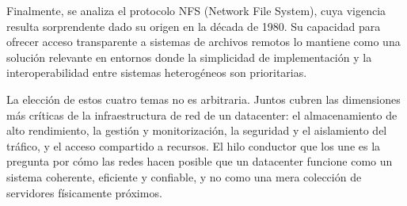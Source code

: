 	Finalmente, se analiza el protocolo NFS (Network File System), cuya vigencia resulta sorprendente dado su origen en la década de 1980. Su capacidad para ofrecer acceso transparente a sistemas de archivos remotos lo mantiene como una solución relevante en entornos donde la simplicidad de implementación y la interoperabilidad entre sistemas heterogéneos son prioritarias.
	
	La elección de estos cuatro temas no es arbitraria. Juntos cubren las dimensiones más críticas de la infraestructura de red de un datacenter: el almacenamiento de alto rendimiento, la gestión y monitorización, la seguridad y el aislamiento del tráfico, y el acceso compartido a recursos. El hilo conductor que los une es la pregunta por cómo las redes hacen posible que un datacenter funcione como un sistema coherente, eficiente y confiable, y no como una mera colección de servidores físicamente próximos.